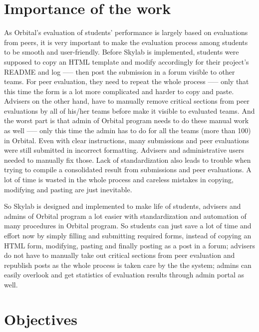 \section{Importance of the work}

As Orbital's evaluation of students' performance is largely based on evaluations from peers, it is very important to make the evaluation process among students to be smooth and user-friendly. Before Skylab is implemented, students were supposed to copy an HTML template and modify accordingly for their project's README and log —-- then post the submission in a forum visible to other teams. For peer evaluation, they need to repeat the whole process —-- only that this time the form is a lot more complicated and harder to copy and paste. Advisers on the other hand, have to manually remove critical sections from peer evaluations by all of his/her teams before make it visible to evaluated teams. And the worst part is that admin of Orbital program needs to do these manual work as well —-- only this time the admin has to do for all the teams (more than 100) in Orbital. Even with clear instructions, many submissions and peer evaluations were still submitted in incorrect formatting.  Advisers and administrative users needed to manually fix those. Lack of standardization also leads to trouble when trying to compile a consolidated result from submissions and peer evaluations. A lot of time is wasted in the whole process and careless mistakes in copying, modifying and pasting are just inevitable. 

So Skylab is designed and implemented to make life of students, advisers and admins of Orbital program a lot easier with standardization and automation of many procedures in Orbital program. So students can just save a lot of time and effort now by simply filling and submitting required forms, instead of copying an HTML form, modifying, pasting and finally posting as a post in a forum; advisers do not have to manually take out critical sections from peer evaluation and republish posts as the whole process is taken care by the the system; admins can easily overlook and get statistics of evaluation results through admin portal as well.

\section{Objectives}

